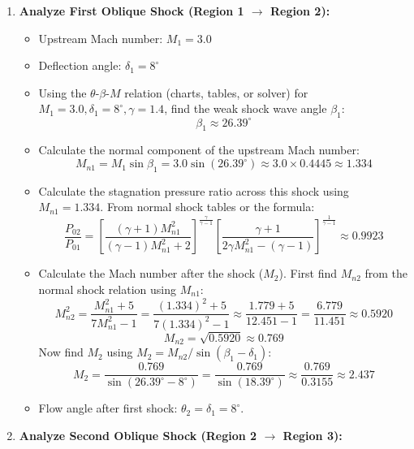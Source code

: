 \begin{enumerate}
\def\labelenumi{\arabic{enumi}.}
\tightlist
\item
  \textbf{Analyze First Oblique Shock (Region 1 \(\to\) Region 2):}

  \begin{itemize}
  \tightlist
  \item
    Upstream Mach number: \(M_1 = 3.0\)
  \item
    Deflection angle: \(\delta_1 = 8^\circ\)
  \item
    Using the \(\theta\)-\(\beta\)-\(M\) relation (charts, tables, or
    solver) for \(M_1=3.0, \delta_1=8^\circ, \gamma=1.4\), find the weak
    shock wave angle \(\beta_1\): \[ \beta_1 \approx 26.39^\circ \]
  \item
    Calculate the normal component of the upstream Mach number:
    \[ M_{n1} = M_1 \sin\beta_1 = 3.0 \sin(26.39^\circ) \approx 3.0 \times 0.4445 \approx 1.334 \]
  \item
    Calculate the stagnation pressure ratio across this shock using
    \(M_{n1}=1.334\). From normal shock tables or the formula:
    \[ \frac{P_{02}}{P_{01}} = \left[ \frac{(\gamma + 1)M_{n1}^2}{(\gamma - 1)M_{n1}^2 + 2} \right]^{\frac{\gamma}{\gamma - 1}} \left[ \frac{\gamma + 1}{2\gamma M_{n1}^2 - (\gamma - 1)} \right]^{\frac{1}{\gamma - 1}} \approx 0.9923 \]
  \item
    Calculate the Mach number after the shock (\(M_2\)). First find
    \(M_{n2}\) from the normal shock relation using \(M_{n1}\):
    \[ M_{n2}^2 = \frac{M_{n1}^2 + 5}{7M_{n1}^2 - 1} = \frac{(1.334)^2 + 5}{7(1.334)^2 - 1} \approx \frac{1.779 + 5}{12.451 - 1} = \frac{6.779}{11.451} \approx 0.5920 \]
    \[ M_{n2} = \sqrt{0.5920} \approx 0.769 \] Now find \(M_2\) using
    \(M_2 = M_{n2} / \sin(\beta_1 - \delta_1)\):
    \[ M_2 = \frac{0.769}{\sin(26.39^\circ - 8^\circ)} = \frac{0.769}{\sin(18.39^\circ)} \approx \frac{0.769}{0.3155} \approx 2.437 \]
  \item
    Flow angle after first shock: \(\theta_2 = \delta_1 = 8^\circ\).
  \end{itemize}
\item
  \textbf{Analyze Second Oblique Shock (Region 2 \(\to\) Region 3):}


\end{enumerate}
